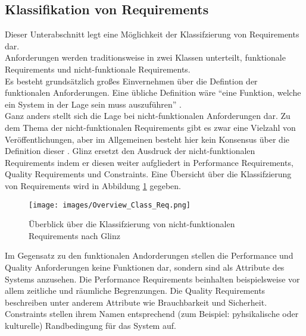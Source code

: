 
 
\subsection{Klassifikation von Requirements}
\label{subsec:ClassReq}
Dieser Unterabschnitt legt eine Möglichkeit der Klassifzierung von Requirements dar.\\ Anforderungen werden traditionsweise in zwei Klassen unterteilt, funktionale Requirements und nicht-funktionale Requirements. \\
Es besteht grundsätzlich großes Einvernehmen über die Defintion der funktionalen Anforderungen. Eine übliche Definition wäre "`eine Funktion, welche ein System in der Lage sein muss auszuführen"' \cite{IEEE90}.\\
Ganz anders stellt sich die Lage bei nicht-funktionalen Anforderungen dar. Zu dem Thema der nicht-funktionalen Requirements gibt es zwar eine Vielzahl von Veröffentlichungen, aber im Allgemeinen besteht hier kein Konsensus über die Definition dieser \cite{Gli07}. Glinz ersetzt den Ausdruck der nicht-funktionalen Requirements indem er diesen weiter aufgliedert in Performance Requirements, Quality Requirements und Constraints. Eine Übersicht über die Klassifzierung von Requirements wird in Abbildung \ref{img:OV_Class_Req} gegeben.\\
\begin{figure}
	\centering
	\texttt{[image: images/Overview\_Class\_Req.png]}
	\caption{Überblick über die Klassifzierung von nicht-funktionalen Requirements nach Glinz \cite{Gli07}}
	\label{img:OV_Class_Req}
\end{figure} 
Im Gegensatz zu den funktionalen Andorderungen stellen die Performance und Quality Anforderungen keine Funktionen dar, sondern sind als Attribute des Systems anzusehen. Die Performance Requirements beinhalten beispielsweise vor allem zeitliche und räumliche Begrenzungen. Die Quality Requirements beschreiben unter anderem Attribute wie Brauchbarkeit und Sicherheit. Constraints stellen ihrem Namen entsprechend (zum Beispiel: pyhsikalische oder kulturelle) Randbedingung für das System auf.

